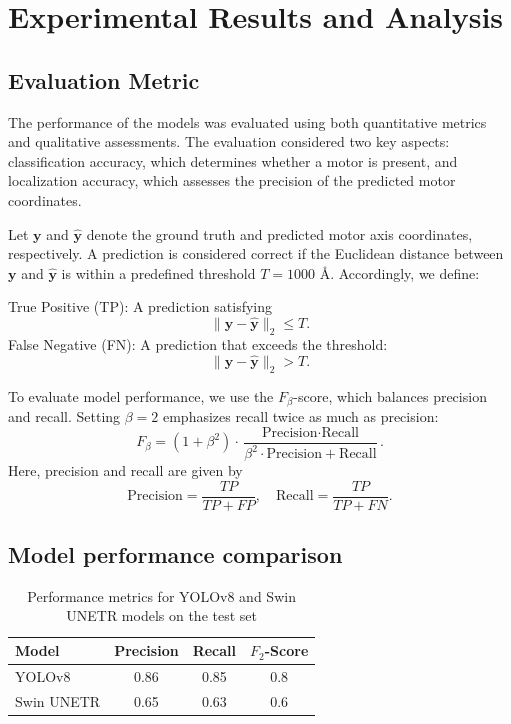 \documentclass{article}
\begin{document}
\section{Experimental Results and Analysis}  
\label{sec:results}  

\subsection{Evaluation Metric}

The performance of the models was evaluated using both quantitative metrics and qualitative assessments. The evaluation considered two key aspects: classification accuracy, which determines whether a motor is present, and localization accuracy, which assesses the precision of the predicted motor coordinates.  

Let \(\mathbf{y}\) and \(\hat{\mathbf{y}}\) denote the ground truth and predicted motor axis coordinates, respectively. A prediction is considered correct if the Euclidean distance between \(\mathbf{y}\) and \(\hat{\mathbf{y}}\) is within a predefined threshold \(T = 1000\) Å. Accordingly, we define:  

True Positive (TP): A prediction satisfying  \[\|\mathbf{y} - \hat{\mathbf{y}}\|_2 \leq T.\]
False Negative (FN): A prediction that exceeds the threshold:  
  \[
  \|\mathbf{y} - \hat{\mathbf{y}}\|_2 > T.
  \]  

To evaluate model performance, we use the \(F_{\beta}\)-score, which balances precision and recall. Setting \(\beta=2\) emphasizes recall twice as much as precision:  
\begin{equation}
    F_\beta = (1+\beta^2) \cdot \frac{\text{Precision} \cdot \text{Recall}}{\beta^2 \cdot \text{Precision} + \text{Recall}}.
\end{equation}  
Here, precision and recall are given by  
\[
\text{Precision} = \frac{TP}{TP + FP}, \quad  
\text{Recall} = \frac{TP}{TP + FN}.
\]  

\subsection{Model performance comparison}

\begin{table}[htb]
    \centering
    \caption{Performance metrics for YOLOv8 and Swin UNETR models on the test set}
    \begin{tabular}{lccc}
        \toprule
        Model & Precision & Recall & $F_2$-Score \\
        \midrule
        YOLOv8 & 0.86 & 0.85 & 0.8 \\
        Swin UNETR & 0.65 & 0.63 & 0.6 \\
        \bottomrule
    \end{tabular}
    \label{tab:combined_results}
\end{table}
\end{document}
